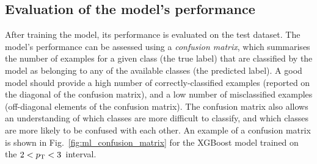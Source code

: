 \begin{table}[tb!]
    \centering
    \caption{Optimised hyperparameter configuration for some representative \pt intervals considered in the model training.}
    \label{tab:ml_hyperparameters}
    \vspace*{0.3cm}
\end{table}

\subsection{Evaluation of the model's performance}\label{sec:ml_performance}
After training the model, its performance is evaluated on the test dataset. The model's performance can be assessed using a \emph{confusion matrix}, which summarises the number of examples for a given class (the true label) that are classified by the model as belonging to any of the available classes (the predicted label). A good model should provide a high number of correctly-classified examples (reported on the diagonal of the confusion matrix), and a low number of misclassified examples (off-diagonal elements of the confusion matrix). The confusion matrix also allows an understanding of which classes are more difficult to classify, and which classes are more likely to be confused with each other. An example of a confusion matrix is shown in Fig.~\ref{fig:ml_confusion_matrix} for the XGBoost model trained on the $2<p_\mathrm{T}<3$~\gevc interval.

